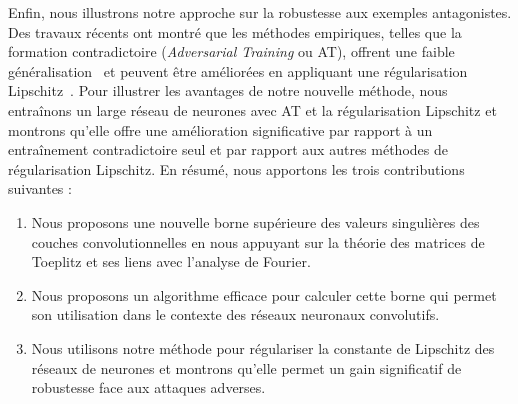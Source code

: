 Enfin, nous illustrons notre approche sur la robustesse aux exemples antagonistes.
Des travaux récents ont montré que les méthodes empiriques, telles que la formation contradictoire (\emph{Adversarial Training} ou AT), offrent une faible généralisation~\cite{schmidt2018adversarially} et peuvent être améliorées en appliquant une régularisation Lipschitz~\cite{farnia2018generalizable}.
Pour illustrer les avantages de notre nouvelle méthode, nous entraînons un large réseau de neurones avec AT et la régularisation Lipschitz et montrons qu'elle offre une amélioration significative par rapport à un entraînement contradictoire seul et par rapport aux autres méthodes de régularisation Lipschitz.
En résumé, nous apportons les trois contributions suivantes :
\begin{enumerate}[leftmargin=0.8cm]
  \item Nous proposons une nouvelle borne supérieure des valeurs singulières des couches convolutionnelles en nous appuyant sur la théorie des matrices de Toeplitz et ses liens avec l'analyse de Fourier.
  \item Nous proposons un algorithme efficace pour calculer cette borne qui permet son utilisation dans le contexte des réseaux neuronaux convolutifs.
  \item Nous utilisons notre méthode pour régulariser la constante de Lipschitz des réseaux de neurones et montrons qu'elle permet un gain significatif de robustesse face aux attaques adverses.
\end{enumerate}







